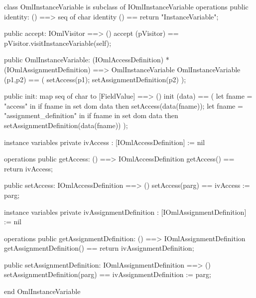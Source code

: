 \begin{vdm_al}
class OmlInstanceVariable is subclass of IOmlInstanceVariable
operations
  public identity: () ==> seq of char
  identity () == return "InstanceVariable";

  public accept: IOmlVisitor ==> ()
  accept (pVisitor) == pVisitor.visitInstanceVariable(self);

  public OmlInstanceVariable:
      (IOmlAccessDefinition) *
      (IOmlAssignmentDefinition) ==> OmlInstanceVariable
  OmlInstanceVariable (p1,p2) == 
   ( setAccess(p1);
     setAssignmentDefinition(p2) );

  public init: map seq of char to [FieldValue] ==> ()
  init (data) ==
    ( let fname = "access" in
        if fname in set dom data
        then setAccess(data(fname));
      let fname = "assignment_definition" in
        if fname in set dom data
        then setAssignmentDefinition(data(fname)) );

instance variables
  private ivAccess : [IOmlAccessDefinition] := nil

operations
  public getAccess: () ==> IOmlAccessDefinition
  getAccess() == return ivAccess;

  public setAccess: IOmlAccessDefinition ==> ()
  setAccess(parg) == ivAccess := parg;

instance variables
  private ivAssignmentDefinition : [IOmlAssignmentDefinition] := nil

operations
  public getAssignmentDefinition: () ==> IOmlAssignmentDefinition
  getAssignmentDefinition() == return ivAssignmentDefinition;

  public setAssignmentDefinition: IOmlAssignmentDefinition ==> ()
  setAssignmentDefinition(parg) == ivAssignmentDefinition := parg;

end OmlInstanceVariable
\end{vdm_al}

